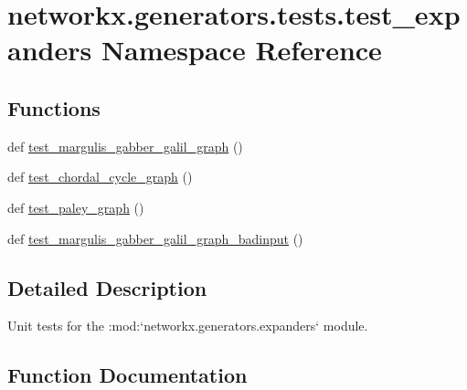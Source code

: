 \hypertarget{namespacenetworkx_1_1generators_1_1tests_1_1test__expanders}{}\section{networkx.\+generators.\+tests.\+test\+\_\+expanders Namespace Reference}
\label{namespacenetworkx_1_1generators_1_1tests_1_1test__expanders}
\subsection*{Functions}
\begin{DoxyCompactItemize}
\item 
def \hyperlink{namespacenetworkx_1_1generators_1_1tests_1_1test__expanders_ad8233f15212aba0533ad9ceef46cb425}{test\+\_\+margulis\+\_\+gabber\+\_\+galil\+\_\+graph} ()
\item 
def \hyperlink{namespacenetworkx_1_1generators_1_1tests_1_1test__expanders_a963648ce70828349bbff73ad23b4ff78}{test\+\_\+chordal\+\_\+cycle\+\_\+graph} ()
\item 
def \hyperlink{namespacenetworkx_1_1generators_1_1tests_1_1test__expanders_a30eefd1f319a39e0510e2f7738b2bbf4}{test\+\_\+paley\+\_\+graph} ()
\item 
def \hyperlink{namespacenetworkx_1_1generators_1_1tests_1_1test__expanders_af5264fb41c9ae951d701170f180b65fb}{test\+\_\+margulis\+\_\+gabber\+\_\+galil\+\_\+graph\+\_\+badinput} ()
\end{DoxyCompactItemize}


\subsection{Detailed Description}
\begin{DoxyVerb}Unit tests for the :mod:`networkx.generators.expanders` module.\end{DoxyVerb}
 

\subsection{Function Documentation}
\mbox{\label{namespacenetworkx_1_1generators_1_1tests_1_1test__expanders_a963648ce70828349bbff73ad23b4ff78}} 
